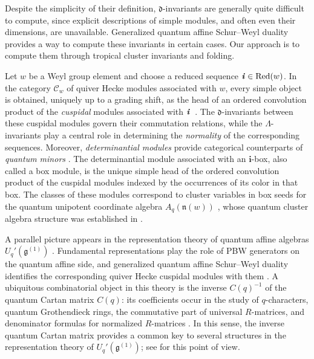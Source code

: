 \documentclass[12pt, leqno]{amsart}
\numberwithin{equation}{section}
\theoremstyle{plain}
\theoremstyle{definition}
\newcommand{\g}{\mathfrak{g}}
\newcommand{\n}{\mathfrak{n}}
\newcommand{\de}{\mathfrak{d}}
\newcommand{\ii}{ \textbf{\textit{i}}}
\newcommand{\bfi}{\mathbf{i}}
\newcommand{\scrC}{\mathscr{C}}
\newcommand{\Red}{\mathrm{Red}}
\begin{document}
\smallskip

Despite the simplicity of their definition, \(\de\)-invariants
are generally quite difficult to compute, since explicit
descriptions of simple modules, and often even their dimensions,
are unavailable.
Generalized quantum affine Schur--Weyl duality provides a way
to compute these invariants in certain cases.
Our approach is to compute them through tropical cluster
invariants and folding.

\smallskip

Let \(w\) be a Weyl group element and choose a reduced 
sequence \(\ii\in\Red(w)\).  In the category \(\scrC_w\) of 
quiver Hecke modules associated with \(w\), every simple 
object is obtained, uniquely up to a grading shift, as the 
head of an ordered convolution product of the \emph{cuspidal} 
modules associated with \(\ii\)~\cite{Kato14,McNa15,TW16}.  The \(\de\)-invariants 
between these cuspidal modules govern
their commutation relations, while the \(\Lambda\)-invariants
play a central role in determining the \emph{normality}
of the corresponding sequences. Moreover, \emph{determinantial modules} provide categorical counterparts
of \emph{quantum minors} \cite{KKOP18}. The determinantial module associated with an \(\bfi\)-box, also called a box module, is the unique simple head of the ordered convolution product of the cuspidal modules indexed by the occurrences of its color in that box.  The classes of these modules correspond to cluster variables in box seeds for the quantum unipotent coordinate algebra \(A_q(\n(w))\) \cite{KKOP24A,KK24}, whose quantum cluster algebra structure was established in \cite{GLS13,GY17,GY21}.

\smallskip

A parallel picture appears in the representation theory of quantum
affine algebras $U_q'(\g^{(1)})$ \cite{CP95A,Kas02,KKOP23P}.  
Fundamental representations play the role of PBW generators on the quantum affine side, 
and generalized quantum affine Schur--Weyl duality identifies the corresponding quiver
Hecke cuspidal modules with them \cite{KKK18}.  A ubiquitous
combinatorial object in this theory is  the inverse
\(C(q)^{-1}\) of the quantum Cartan matrix \(C(q)\): its
coefficients occur in the study of \(q\)-characters, quantum
Grothendieck rings, the commutative part of universal
\(R\)-matrices, and denominator formulas for normalized
\(R\)-matrices \cite{FR99,Nak04,HL15,FO21,FM21}.  In this sense, the
inverse quantum Cartan matrix provides a common key to  several
structures in the representation theory of $U_q'(\g^{(1)})$; see
\cite[Introduction]{FM21} for this point of view.
\end{document}
